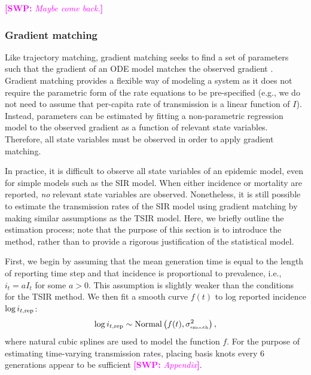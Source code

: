\documentclass{article}
\newcommand{\comment}[3]{\textcolor{#1}{\textbf{[#2: }\textsl{#3}\textbf{]}}}
\newcommand{\swp}[1]{\comment{magenta}{SWP}{#1}}
\newcommand{\tsub}[2]{#1_{{\textrm{\tiny #2}}}}
\begin{document}
\swp{Maybe come back.}

\subsubsection*{Gradient matching}

Like trajectory matching, gradient matching seeks to find a set of parameters such that the gradient of an ODE model matches the observed gradient \citep{ellner2002fitting}.
Gradient matching provides a flexible way of modeling a system as it does not require the parametric form of the rate equations to be pre-specified (e.g., we do not need to assume that per-capita rate of transmission is a linear function of $I$).
Instead, parameters can be estimated by fitting a non-parametric regression model to the observed gradient as a function of relevant state variables.
Therefore, all state variables must be observed in order to apply gradient matching.

In practice, it is difficult to observe all state variables of an epidemic model, even for simple models such as the SIR model.
When either incidence or mortality are reported, \emph{no} relevant state variables are observed.
Nonetheless, it is still possible to estimate the transmission rates of the SIR model using gradient matching by making similar assumptions as the TSIR model.
Here, we briefly outline the estimation process;
note that the purpose of this section is to introduce the method, rather than to provide a rigorous justification of the statistical model.

First, we begin by assuming that the mean generation time is equal to the length of reporting time step and that incidence is proportional to prevalence, i.e., $i_t = a I_t$ for some $a > 0$. 
This assumption is slightly weaker than the conditions for the TSIR method.
We then fit a smooth curve $f(t)$ to log reported incidence $\log i_{t, {\tiny \textrm{rep}}}$:
\begin{equation}
\log i_{t, {\tiny \textrm{rep}}} \sim \mathrm{Normal}\left(f(t), \tsub{\sigma}{smooth}^2 \right),
\end{equation}
where natural cubic splines are used to model the function $f$.
For the purpose of estimating time-varying transmission rates, placing basis knots every 6 generations appear to be sufficient \swp{Appendix}.
\end{document}
